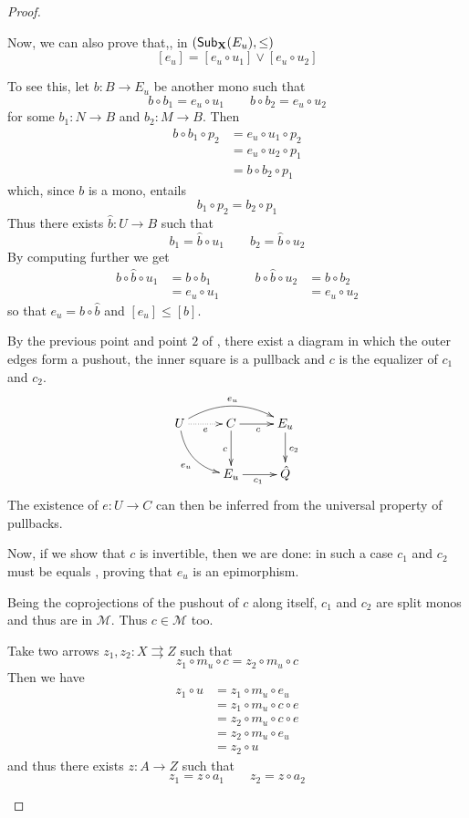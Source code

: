 \documentclass[a4paper]{article}
\newcommand{\msub}[2]{\mathsf{Sub}_{\textbf {\textup{#1}}}(#2)}
\theoremstyle{definition}
\begin{document}
\begin{proof}
\begin{enumerate}
		Now, we can also prove that,, in $(\msub{X}{E_u}, \leq)$ 
		\[[e_u]=[e_u\circ u_1]\vee [e_u\circ u_2]\]
		
		To see this, let  $b\colon B\to E_u$ be another mono such that 
		\[b\circ b_1 =e_u\circ u_1 \qquad b\circ b_2 =e_u\circ u_2\] 
		for some $b_1\colon N\to B$ and $b_2\colon M\to B$. Then 
		\begin{align*}
			b \circ b_1 \circ p_2 & = e_u \circ u_1\circ p_2\\&= e_u \circ  u_2\circ p_1\\&=b\circ b_2\circ p_1
		\end{align*}
		which, since $b$ is a mono, entails
		\[b_1\circ  p_2 =  b_2\circ p_1\]
		Thus there exists $\hat{b}\colon U\to B$ such that
		\[b_1 =\hat{b} \circ u_1 \qquad b_2=\hat{b}\circ u_2\]
		By computing further we get
		\[\begin{split}
			b\circ \hat{b} \circ u_1 &=b\circ b_1 \\&=e_u\circ u_1 
		\end{split}\qquad \begin{split}
			b\circ \hat{b} \circ u_2 &=b\circ b_2 \\&=e_u\circ u_2 
		\end{split}\]
	so that $e_u=b\circ \hat{b}$ and $[e_u] \leq [b]$. 
	
	By the previous point and point $2$ of , there exist a diagram in which the outer edges form a pushout, the inner square is a pullback  and $c$ is the equalizer of $c_1$ and $c_2$.
		\[\xymatrix{U  \ar@/^.5cm/[rr]^{e_u} \ar@/_.4cm/[dr]_{e_u}  \ar@{.>}[r]_{e}& C \ar[d]_{c} \ar[r]_{c} & E_u \ar[d]^{c_2} \\  & E_u \ar[r]_{c_1} & \hat{Q}}\]
		The existence of $e\colon U\to C$ can then be inferred from the universal property of pullbacks.
		
		Now, if we show that $c$ is invertible, then we are done: in such a case $c_1$ and $c_2$ must be equals , proving that $e_u$ is an epimorphism.  
		
		Being the coprojections of the pushout of $c$ along itself,  $c_1$ and $c_2$ are split monos and thus are in $\mathcal{M}$. Thus $c\in \mathcal{M}$ too. 
		
		Take two arrows $z_1, z_2\colon X\rightrightarrows Z $ such that
		\[z_1\circ m_u\circ c=z_2\circ m_u \circ c\]
			Then we have
		\begin{align*}
			z_1\circ u &= z_1\circ m_u\circ e_u \\&= z_1\circ m_u\circ c \circ e \\&= z_2\circ m_u\circ c \circ e \\&= z_2\circ m_u \circ e_u\\&= z_2\circ u 
		\end{align*}
		and thus there exists $z\colon A\to Z$ such that 
		\[z_1= z\circ a_1\qquad z_2=z\circ a_2\]
		

\end{enumerate}
\end{proof}
\end{document}
